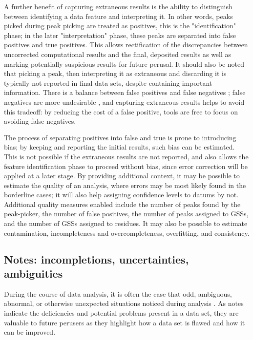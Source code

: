 A further benefit of capturing extraneous results is the ability to distinguish
between identifying a data feature and interpreting it.  In other words, peaks
picked during peak picking are treated as positives, this is the "identification"
phase; in the later "interpretation" phase, these peaks are separated into
false positives and true positives.  This allows rectification of the 
discrepancies between uncorrected computational results and the final,
deposited results as well as marking potentially suspicious results for 
future perusal.  It should also be noted that picking a peak, then
interpreting it as extraneous and discarding it is typically not reported in
final data sets, despite containing important information.
There is a balance between false positives and false negatives \cite{pine};
false negatives are more undesirable \cite{pine, saga, guntert2009automated},
and capturing extraneous results helps to avoid this tradeoff: by reducing
the cost of a false positive, tools are free to focus on avoiding false
negatives.

The process of separating positives into false and true is prone to 
introducing bias; by keeping and reporting the initial results, such bias
can be estimated.  This is not possible if the extraneous results are not
reported, and also allows the feature identification phase to proceed
without bias, since error correction will be applied at a later stage. 
By providing additional context, it may be possible to estimate the quality 
of an analysis, where errors may be most likely found in the borderline 
cases; it will also help assigning confidence levels to datums by not.
Additional quality measures enabled include the number of peaks found by the
peak-picker, the number of false positives, the number of peaks assigned to
GSSs, and the number of GSSs assigned to residues.  It may also be possible
to estimate contamination, incompleteness and overcompleteness, overfitting, 
and consistency.


\subsection{Notes: incompletions, uncertainties, ambiguities}
During the course of data analysis, it is often the case that odd, ambiguous,
abnormal, or otherwise unexpected situations noticed during analysis
\cite{nuseibeh2000inconsistency}.  
As notes indicate the deficiencies and 
potential problems present in a data set, they are valuable to future 
perusers as they highlight how a data set is flawed and how it can be improved.

